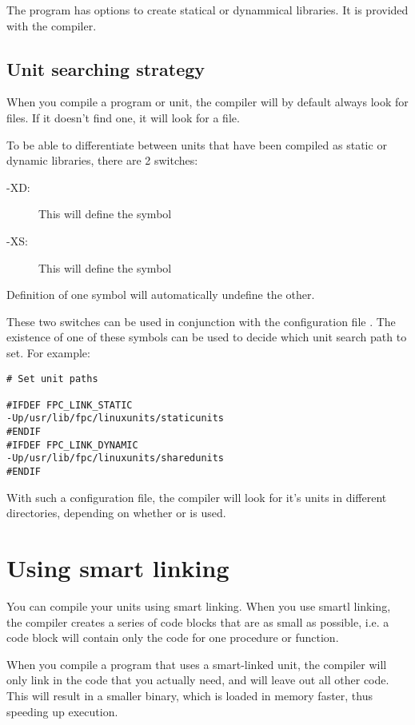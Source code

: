 \documentclass{report}
\begin{document}
The  program has options to create statical or dynammical
libraries. It is provided with the compiler.

\subsection{Unit searching strategy}

When you compile a program or unit, the compiler will by
default always look for  files. If it doesn't find one, it will
look for a  file. 

To be able to differentiate between units that have been compiled as static
or dynamic libraries, there are 2 switches:

\begin{description} 
\item [-XD:\ ] This will define the symbol 
\item [-XS:\ ] This will define the symbol 
\end{description}
Definition of one symbol will automatically undefine the other.

These two switches can be used in conjunction with the configuration file
. The existence of one of these symbols can be used to
decide which unit search path to set. For example:
\begin{verbatim}
# Set unit paths

#IFDEF FPC_LINK_STATIC
-Up/usr/lib/fpc/linuxunits/staticunits
#ENDIF
#IFDEF FPC_LINK_DYNAMIC
-Up/usr/lib/fpc/linuxunits/sharedunits
#ENDIF
\end{verbatim}
With such a configuration file, the compiler will look for it's units in
different directories, depending on whether  or  is used.

\section{Using smart linking}
\label{se:SmartLinking}

You can compile your units using smart linking. When you use smartl linking,
the compiler creates a series of code blocks that are as small as possible,
i.e. a code block will contain only the code for one procedure or function.
 
When you compile a program that uses a smart-linked unit, the compiler will
only link in the code that you actually need, and will leave out all other
code. This will result in a smaller binary, which is loaded in memory  
faster, thus speeding up execution.
\end{document}
